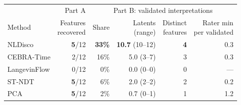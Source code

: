 \begin{tabular*}{\linewidth}{@{\extracolsep{\fill}}lrrrrr@{}}
\toprule
 & Part A & \multicolumn{4}{c}{Part B: validated interpretations} \\
\cmidrule(lr){2-2}\cmidrule(l){3-6}
Method & \shortstack{Features\\recovered} & Share & \shortstack{Latents\\(range)} & \shortstack{Distinct\\features} & \shortstack{Rater min\\per validated} \\
\midrule
NLDisco & \textbf{5}/12 & \textbf{33\%} & \textbf{10.7} (10--12) & \textbf{4} & 0.3 \\
CEBRA-Time & 2/12 & 16\% & 5.0 (3--7) & 3 & 0.3 \\
LangevinFlow & 0/12 & 0\% & 0.0 (0--0) & 0 & --- \\
ST-NDT & \textbf{5}/12 & 6\% & 2.0 (2--2) & 2 & 0.2 \\
PCA & \textbf{5}/12 & 2\% & 0.7 (0--1) & 1 & 1.2 \\
\bottomrule
\end{tabular*}
